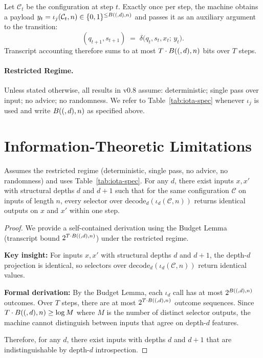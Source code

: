   \begin{definition}\label{def:iota-injection}
  Let $\mathcal{C}_t$ be the configuration at step $t$. Exactly once per step, the machine obtains a payload $y_t = \iota_j(\mathcal{C}_t, n) \in \{0,1\}^{\le B((,d),n)}$ and passes it as an auxiliary argument to the transition:
  \[
  (q_{t+1}, s_{t+1}) \;=\; \delta\bigl(q_t, s_t, x_t;\, y_t\bigr).
  \]
  Transcript accounting therefore sums to at most $T \cdot B((,d),n)$ bits over $T$ steps.
  \end{definition}
  
  
  \paragraph{Restricted Regime.}
  Unless stated otherwise, all results in v0.8 assume: deterministic; single pass over input; no advice; no randomness.
  We refer to Table~\ref{tab:iota-spec} whenever $\iota_j$ is used and write $B((,d),n)$ as specified above.
  
  \section{Information-Theoretic Limitations}
  
  \begin{lemma}
  Assumes the restricted regime (deterministic, single pass, no advice, no randomness) and uses Table~\ref{tab:iota-spec}.
  For any $d$, there exist inputs $x,x'$ with structural depths $d$ and $d{+}1$ such that for the same configuration $\mathcal{C}$ on inputs of length $n$, every selector over $\mathrm{decode}_d(\iota_d(\mathcal{C},n))$ returns identical outputs on $x$ and $x'$ within one step.
  \end{lemma}
  
  \begin{proof}
We provide a self-contained derivation using the Budget Lemma (transcript bound $2^{T \cdot B((,d),n)}$) under the restricted regime.
  
  \textbf{Key insight:} For inputs $x,x'$ with structural depths $d$ and $d+1$, the depth-$d$ projection is identical, so selectors over $\mathrm{decode}_d(\iota_d(\mathcal{C},n))$ return identical values.
  
\textbf{Formal derivation:} By the Budget Lemma, each $\iota_d$ call has at most $2^{B((,d),n)}$ outcomes. Over $T$ steps, there are at most $2^{T \cdot B((,d),n)}$ outcome sequences. Since $T \cdot B((,d),n) \ge \log M$ where $M$ is the number of distinct selector outputs, the machine cannot distinguish between inputs that agree on depth-$d$ features.
  
  Therefore, for any $d$, there exist inputs with depths $d$ and $d+1$ that are indistinguishable by depth-$d$ introspection.
  \end{proof}
  
